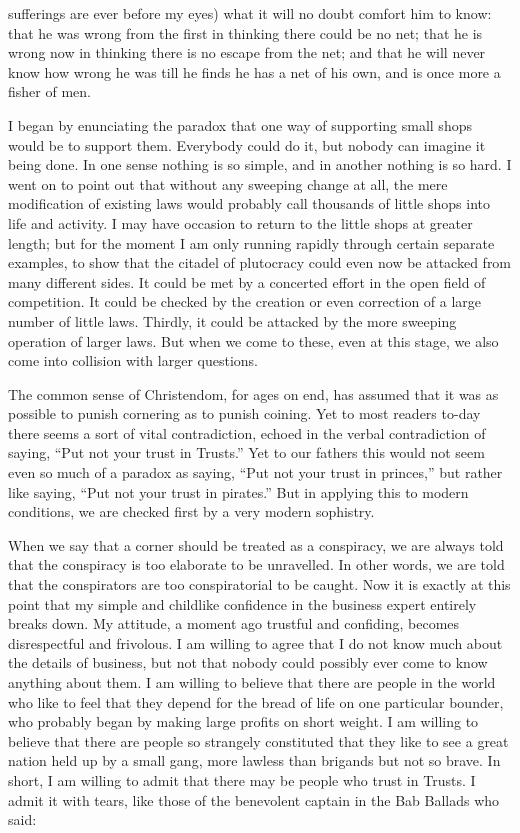 \documentclass{book}
\begin{document}
sufferings are ever before my eyes) what it will no doubt comfort him to know: that he was wrong from the first in thinking there could be no net; that he is wrong now in thinking there is no escape from the net; and that he will never know how wrong he was till he finds he has a net of his own, and is once more a fisher of men.

I began by enunciating the paradox that one way of supporting small shops would be to support them. Everybody could do it, but nobody can imagine it being done. In one sense nothing is so simple, and in another nothing is so hard. I went on to point out that without any sweeping change at all, the mere modification of existing laws would probably call thousands of little shops into life and activity. I may have occasion to return to the little shops at greater length; but for the moment I am only running rapidly through certain separate examples, to show that the citadel of plutocracy could even now be attacked from many different sides. It could be met by a concerted effort in the open field of competition. It could be checked by the creation or even correction of a large number of little laws. Thirdly, it could be attacked by the more sweeping operation of larger laws. But when we come to these, even at this stage, we also come into collision with larger questions.

The common sense of Christendom, for ages on end, has assumed that it was as possible to punish cornering as to punish coining. Yet to most readers to-day there seems a sort of vital contradiction, echoed in the verbal contradiction of saying, “Put not your trust in Trusts.” Yet to our fathers this would not seem even so much of a paradox as saying, “Put not your trust in princes,” but rather like saying, “Put not your trust in pirates.” But in applying this to modern conditions, we are checked first by a very modern sophistry.

When we say that a corner should be treated as a conspiracy, we are always told that the conspiracy is too elaborate to be unravelled. In other words, we are told that the conspirators are too conspiratorial to be caught. Now it is exactly at this point that my simple and childlike confidence in the business expert entirely breaks down. My attitude, a moment ago trustful and confiding, becomes disrespectful and frivolous. I am willing to agree that I do not know much about the details of business, but not that nobody could possibly ever come to know anything about them. I am willing to believe that there are people in the world who like to feel that they depend for the bread of life on one particular bounder, who probably began by making large profits on short weight. I am willing to believe that there are people so strangely constituted that they like to see a great nation held up by a small gang, more lawless than brigands but not so brave. In short, I am willing to admit that there may be people who trust in Trusts. I admit it with tears, like those of the benevolent captain in the Bab Ballads who said:
\end{document}
